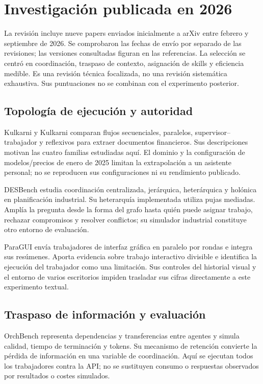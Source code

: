 \section{Investigación publicada en 2026}
La revisión incluye nueve papers enviados inicialmente a arXiv entre febrero y septiembre de 2026. Se comprobaron las fechas de envío por separado de las revisiones; las versiones consultadas figuran en las referencias. La selección se centró en coordinación, traspaso de contexto, asignación de skills y eficiencia medible. Es una revisión técnica focalizada, no una revisión sistemática exhaustiva. Sus puntuaciones no se combinan con el experimento posterior.

\subsection{Topología de ejecución y autoridad}
Kulkarni y Kulkarni comparan flujos secuenciales, paralelos, supervisor--trabajador y reflexivos para extraer documentos financieros. Sus descripciones motivan las cuatro familias estudiadas aquí. El dominio y la configuración de modelos/precios de enero de 2025 limitan la extrapolación a un asistente personal; no se reproducen sus configuraciones ni su rendimiento publicado.

DESBench estudia coordinación centralizada, jerárquica, heterárquica y holónica en planificación industrial. Su heterarquía implementada utiliza pujas mediadas. Amplía la pregunta desde la forma del grafo hasta quién puede asignar trabajo, rechazar compromisos y resolver conflictos; su simulador industrial constituye otro entorno de evaluación.

ParaGUI envía trabajadores de interfaz gráfica en paralelo por rondas e integra sus resúmenes. Aporta evidencia sobre trabajo interactivo divisible e identifica la ejecución del trabajador como una limitación. Sus controles del historial visual y el entorno de varios escritorios impiden trasladar sus cifras directamente a este experimento textual.

\subsection{Traspaso de información y evaluación}
OrchBench representa dependencias y transferencias entre agentes y simula calidad, tiempo de terminación y tokens. Su mecanismo de retención convierte la pérdida de información en una variable de coordinación. Aquí se ejecutan todos los trabajadores contra la API; no se sustituyen consumo o respuestas observados por resultados o costes simulados.


